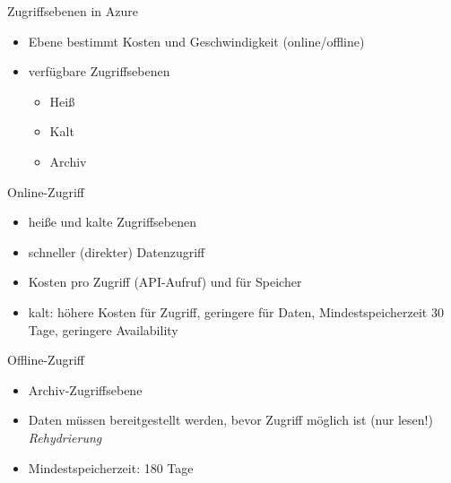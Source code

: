 

\begin{flashcard}[Definition]{Zugriffsebenen in Azure}
  \begin{itemize}
    \item Ebene bestimmt Kosten und Geschwindigkeit (online/offline)
    \item verfügbare Zugriffsebenen
      \begin{itemize}
        \item Heiß
        \item Kalt
        \item Archiv
      \end{itemize}
  \end{itemize}
\end{flashcard}

\begin{flashcard}[Definition]{Online-Zugriff}
  \begin{itemize}
    \item heiße und kalte Zugriffsebenen
    \item schneller (direkter) Datenzugriff
    \item Kosten pro Zugriff (API-Aufruf) und für Speicher
    \item kalt: höhere Kosten für Zugriff, geringere für Daten, Mindestspeicherzeit 30 Tage, geringere Availability
  \end{itemize}
\end{flashcard}
 
\begin{flashcard}[Definition]{Offline-Zugriff}
  \begin{itemize}
    \item Archiv-Zugriffsebene
    \item Daten müssen bereitgestellt werden, bevor Zugriff möglich ist (nur lesen!)\newline
      \emph{Rehydrierung}
    \item Mindestspeicherzeit: 180 Tage
  \end{itemize}
\end{flashcard}
 
